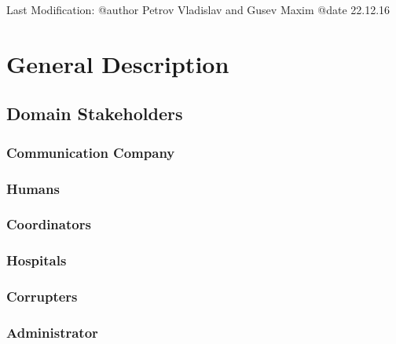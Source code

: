  Last Modification:
 @author Petrov Vladislav and Gusev Maxim
 @date 22.12.16

\chapter{General Description}
\label{chap:general_description}



\section{Domain Stakeholders}
\label{sec:lu.uni.lassy.excalibur.examples.icrash-gendescr-stakeholders}


\subsection{Communication Company}


\subsection{Humans}


\subsection{Coordinators}


\subsection{Hospitals}


\subsection{Corrupters}


\subsection{Administrator}


